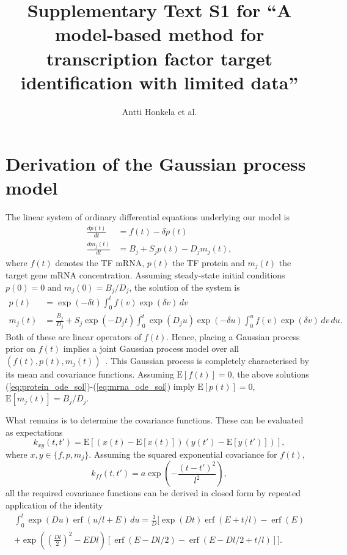 \documentclass{article}
\title{Supplementary Text S1 for ``A model-based method for
  transcription factor target identification with limited data''}
\author{Antti Honkela et al.}
\date{}
\newcommand{\erf}{\operatorname{erf}}
\begin{document}
\maketitle

\section{Derivation of the Gaussian process model}

The linear system of ordinary differential equations underlying our model is
\begin{align}
  \label{eq:translation_ode}
  \frac{dp(t)}{dt} & = f(t) - \delta p(t) \\
  \label{eq:translation_ode}
  \frac{dm_j(t)}{dt} & = B_j + S_j p(t) - D_j m_j(t),
\end{align}
where $f(t)$ denotes the TF mRNA, $p(t)$ the
TF protein and $m_j(t)$ the target gene mRNA concentration.
Assuming steady-state initial conditions $p(0) = 0$ and
$m_j(0) = B_j / D_j$, the solution of the system is
\begin{align}
  \label{eq:protein_ode_sol}
  p(t) & = \exp(-\delta t) \int_0^t f(v) \exp(\delta v) \, dv \\
  \label{eq:mrna_ode_sol}
  m_j(t) & = \frac{B_j}{D_j} + S_j \exp(-D_j t) \int_0^t \exp(D_j
  u) \exp(-\delta u) \int_0^u f(v) \exp(\delta v) \, dv \, du.
\end{align}
Both of these are linear operators of $f(t)$.  Hence, placing a
Gaussian process prior on $f(t)$ implies a joint Gaussian process
model over all $(f(t), p(t), m_j(t))$~\cite{Rasmussen2006,Lawrence2007}.
This Gaussian process is completely characterised by its mean and
covariance functions.  Assuming $\mathrm{E}[f(t)] = 0$, the above
solutions (\ref{eq:protein_ode_sol})-(\ref{eq:mrna_ode_sol}) imply
$\mathrm{E}[p(t)] = 0$, $\mathrm{E}[m_j(t)] = B_j / D_j$.

What remains is to determine the covariance functions.  These can
be evaluated as expectations
\begin{equation}
  \label{eq:kernel_definition}
  k_{xy}(t,t') = \mathrm{E}[(x(t) - \mathrm{E}[x(t)])(y(t') - \mathrm{E}[y(t')])],
\end{equation}
where $x,y \in \{f, p, m_j\}$.  Assuming the squared exponential
covariance for $f(t)$,
\begin{equation}
  \label{eq:sqexp_kernel}
  k_{ff}(t, t') = a \exp\left( -\frac{(t-t')^2}{l^2} \right),
\end{equation}
all the required covariance functions can be derived in closed form
by repeated application of the identity
\begin{multline}
  \label{eq:gpsim_identity}
  \int_0^t \exp(D u) \erf(u/l + E)\,du =
  \frac{1}{D} \bigg[
  \exp(Dt) \erf(E + t/l) - \erf(E) \\
  + \exp\left(\left( \frac{Dl}{2}\right)^2 -E Dl \right)
  [ \erf(E - Dl/2) - \erf(E-Dl/2+t/l) ]
  \bigg].
\end{multline}
\end{document}

